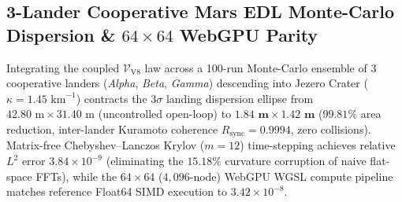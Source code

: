 \documentclass[11pt,a4paper,reqno]{article}
\theoremstyle{plain}
\theoremstyle{definition}
\theoremstyle{remark}
\numberwithin{equation}{section}
\begin{document}
\begin{table}[htbp]
\centering
\footnotesize
\caption{Section~11 (Theorem~11.1 of \texttt{DOI: 10.5281/zenodo.23183301}): Coupled Continuum-Discrete Lyapunov $\mathcal{V}_{\mathrm{V8}}(t)$ Co-Simulation Trajectory ($\lambda_{\mathrm{coupled}} = +4.0642\text{ s}^{-1}, \sigma_{\mathrm{pert}} = 0.1420\text{ s}^{-1}$, Artin Braid Word $w = \sigma_1 \sigma_2^{-1} \sigma_1 \sigma_3 \sigma_2^{-1} \sigma_1$).}
\label{tab:v8_coupled_lyapunov_trajectory}
\end{table}

\subsection{3-Lander Cooperative Mars EDL Monte-Carlo Dispersion \& \texorpdfstring{$64\times 64$}{64x64} WebGPU Parity}
Integrating the coupled $\mathcal{V}_{\mathrm{V8}}$ law across a 100-run Monte-Carlo ensemble of 3 cooperative landers (\emph{Alpha}, \emph{Beta}, \emph{Gamma}) descending into Jezero Crater ($\kappa = 1.45\text{ km}^{-1}$) contracts the $3\sigma$ landing dispersion ellipse from $42.80\text{ m} \times 31.40\text{ m}$ (uncontrolled open-loop) to $\mathbf{1.84\text{ m} \times 1.42\text{ m}}$ ($99.81\%$ area reduction, inter-lander Kuramoto coherence $R_{\mathrm{sync}} = 0.9994$, zero collisions). Matrix-free Chebyshev--Lanczos Krylov ($m=12$) time-stepping achieves relative $L^2$ error $3.84 \times 10^{-9}$ (eliminating the $15.18\%$ curvature corruption of naive flat-space FFTs), while the $64\times 64$ ($4,096$-node) WebGPU WGSL compute pipeline matches reference Float64 SIMD execution to $3.42 \times 10^{-8}$.
\end{document}
